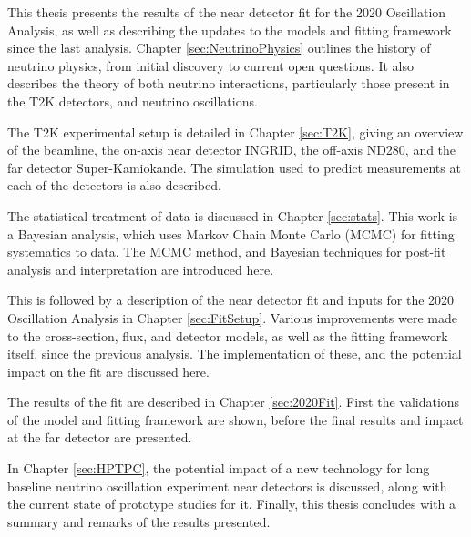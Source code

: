 This thesis presents the results of the near detector fit for the 2020 Oscillation Analysis, as well as describing the updates to the models and fitting framework since the last analysis. Chapter \ref{sec:NeutrinoPhysics} outlines the history of neutrino physics, from initial discovery to current open questions. It also describes the theory of both neutrino interactions, particularly those present in the T2K detectors, and neutrino oscillations.

The T2K experimental setup is detailed in Chapter \ref{sec:T2K}, giving an overview of the beamline, the on-axis near detector INGRID, the off-axis ND280, and the far detector Super-Kamiokande. The simulation used to predict measurements at each of the detectors is also described.

The statistical treatment of data is discussed in Chapter \ref{sec:stats}. This work is a Bayesian analysis, which uses Markov Chain Monte Carlo (MCMC) for fitting systematics to data. The MCMC method, and Bayesian techniques for post-fit analysis and interpretation are introduced here.

This is followed by a description of the near detector fit and inputs for the 2020 Oscillation Analysis in Chapter \ref{sec:FitSetup}. Various improvements were made to the cross-section, flux, and detector models, as well as the fitting framework itself, since the previous analysis. The implementation of these, and the potential impact on the fit are discussed here.

The results of the fit are described in Chapter \ref{sec:2020Fit}. First the validations of the model and fitting framework are shown, before the final results and impact at the far detector are presented.

In Chapter \ref{sec:HPTPC}, the potential impact of a new technology for long baseline neutrino oscillation experiment near detectors is discussed, along with the current state of prototype studies for it. Finally, this thesis concludes with a summary and remarks of the results presented.

\newpage